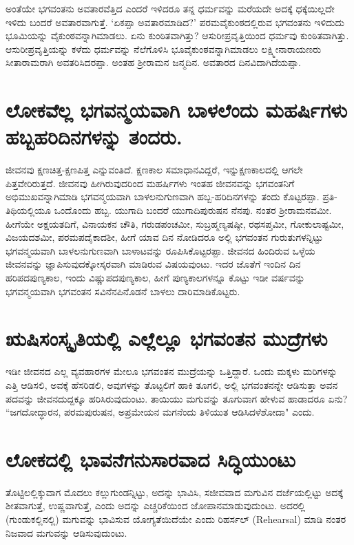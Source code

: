 ಅಂತೆಯೇ ಭಗವಂತನು ಅವತಾರವೆತ್ತಿದ ಎಂದರೆ ಇಳಿದರೂ ತನ್ನ ಧರ್ಮವನ್ನು ಮರೆಯದೇ ಅದಕ್ಕೆ ಧಕ್ಕೆಯಿಲ್ಲದೇ ಇಳಿದು ಬಂದರೆ ಅವತಾರವಾಗುತ್ತೆ. `ಏಕಪ್ಪಾ ಅವತಾರಮಾಡಿದ?' ಪರಮವೈಕುಂಠದಲ್ಲಿರುವ ಭಗವಂತನು ಇಳಿದುದು ಭೂಮಿಯನ್ನು ವೈಕುಂಠವನ್ನಾಗಿಮಾಡಲು. ಏನು ಕುಂಠಿತವಾಗಿತ್ತು? ಆಸುರೀಪ್ರವೃತ್ತಿಯಿಂದ ಧರ್ಮವು ಕುಂಠಿತವಾಗಿತ್ತು. ಆಸುರೀಪ್ರವೃತ್ತಿಯನ್ನು ಕಳೆದು ಧರ್ಮವನ್ನು ನೆಲೆಗೊಳಿಸಿ ಭೂವೈಕುಂಠವನ್ನಾಗಿಮಾಡಲು ಲಕ್ಷ್ಮೀನಾರಾಯಣರು ಸೀತಾರಾಮರಾಗಿ ಅವತರಿಸಿದರಪ್ಪಾ. ಅಂತಹ ಶ್ರೀರಾಮನ ಜನ್ಮದಿನ. ಅವತಾರದ ದಿನವಿದಾಗಿದೆಯಪ್ಪಾ. 

\section*{ಲೋಕವೆಲ್ಲ ಭಗವನ್ಮಯವಾಗಿ ಬಾಳಲೆಂದು ಮಹರ್ಷಿಗಳು ಹಬ್ಬಹರಿದಿನಗಳನ್ನು ತಂದರು.} 

ಜೀವನವು ಕ್ಷಣಚಿತ್ತ-ಕ್ಷಣಪಿತ್ತ ಎನ್ನುವಂತಿದೆ. ಕ್ಷಣಕಾಲ ಸಮಾಧಾನವಿದ್ದರೆ, ಇನ್ನುಕ್ಷಣಕಾಲದಲ್ಲಿ ಆಗಲೇ ಪಿತ್ತವೇರಿರುತ್ತದೆ. ಜೀವನವು ಹೀಗಿರುವುದರಿಂದ ಮಹರ್ಷಿಗಳು ಇಂತಹ ಜೀವನವನ್ನು ಭಗವಂತನಿಗೆ ಅಭಿಮುಖವನ್ನಾಗಿಮಾಡಿ ಭಗವನ್ಮಯವಾಗಿ ಬಾಳಲನುಗುಣವಾಗಿ ಹಬ್ಬ-ಹರಿದಿನಗಳನ್ನು ತಂದು ಕೊಟ್ಟರಪ್ಪಾ. ಪ್ರತಿ-ತಿಥಿಯಲ್ಲಿಯೂ ಒಂದೊಂದು ಹಬ್ಬ. ಯುಗಾದಿ ಬಂದರೆ ಯುಗಾದಿಪುರುಷನ ನೆನಪು. ನಂತರ ಶ್ರೀರಾಮನವಮೀ. ಹೀಗೆಯೇ ಅಕ್ಷಯತದಿಗೆ, ವಿನಾಯಕನ ಚೌತಿ, ಗರುಡಪಂಚಮೀ, ಸುಬ್ರಹ್ಮಣ್ಯಷಷ್ಠೀ, ರಥಸಪ್ತಮೀ, ಗೋಕುಲಾಷ್ಟಮೀ, ವಿಜಯದಶಮೀ, ಪರಮಪದೈಕಾದಶೀ, ಹೀಗೆ ಯಾವ ದಿನ ನೋಡಿದರೂ ಅಲ್ಲಿ ಭಗವಂತನ ಗುರುತುಗಳನ್ನಿಟ್ಟು ಭಗವನ್ಮಯವಾಗಿ ಬಾಳಲನುಗುಣವಾಗಿ ಬಾಳಾಟವನ್ನು ರೂಪಿಸಿಕೊಟ್ಟರಪ್ಪಾ. ಜೀವನದ ಹಿಂದಿರುವ ಒಳ್ಳೆಯ ಜೀವನವನ್ನು ಜ್ಞಾಪಿಸುವುದಕ್ಕೋಸ್ಕರವಾಗಿ ಮಾಡಿರುವ ವಿಷಯವುಂಟು. ಇದರ ಜೊತೆಗೆ ಇಂದಿನ ದಿನ ಹರಿಪದಪುಣ್ಯಕಾಲ, ಇಂದು ವಿಷ್ಣುಪದಪುಣ್ಯಕಾಲ, ಹೀಗೆ ಪುಣ್ಯಕಾಲಗಳನ್ನೂ ಕೊಟ್ಟು ಇಡೀ ವರ್ಷವನ್ನು ಭಗವನ್ಮಯವಾಗಿ ಭಗವಂತನ ಸವಿನೆನಪಿನೊಡನೆ ಬಾಳಲು ದಾರಿಮಾಡಿಕೊಟ್ಟರು. 

\section*{ಋಷಿಸಂಸ್ಕೃತಿಯಲ್ಲಿ ಎಲ್ಲೆಲ್ಲೂ ಭಗವಂತನ ಮುದ್ರೆಗಳು}

ಇಡೀ ಜೀವನದ ಎಲ್ಲ ವ್ಯವಹಾರಗಳ ಮೇಲೂ ಭಗವಂತನ ಮುದ್ರೆಯನ್ನು ಒತ್ತಿದ್ದಾರೆ. ಒಂದು ಮಕ್ಕಳು ಮರಿಗಳನ್ನು ಎತ್ತಿ ಆಡಿಸಲಿ, ಅವಕ್ಕೆ ಹೆಸರಿಡಲಿ, ಅವುಗಳನ್ನು ತೊಟ್ಟಲಿಗೆ ಹಾಕಿ ತೂಗಲಿ, ಅಲ್ಲಿ ಭಗವಂತನನ್ನೇ ಆಡಿಸುತ್ತಾ ಅವನ ಪದವನ್ನು ಜೀವನದುದ್ದಕ್ಕೂ ಹರಿಸಿರುವುದುಂಟು. ತಾಯಿಯು ಮಗುವನ್ನು ತೂಗುವಾಗ ಹೇಳುವ ಹಾಡಾದರೂ ಏನು? ``ಜಗದೋದ್ಧಾರನ, ಪರಮಪುರುಷನ, ಅಪ್ರಮೇಯನ ಮಗನೆಂದು ತಿಳಿಯುತ ಆಡಿಸಿದಳೆಶೋದಾ" ಎಂದು. 

\section*{ಲೋಕದಲ್ಲಿ ಭಾವನೆಗನುಸಾರವಾದ ಸಿದ್ಧಿಯುಂಟು}

ತೊಟ್ಟಿಲಲ್ಲಿಕ್ಕುವಾಗ ಮೊದಲು ಕಲ್ಲುಗುಂಡನ್ನಿಟ್ಟು, ಅದನ್ನು ಭಾವಿಸಿ, ಸಜೀವವಾದ ಮಗುವಿನ ದರ್ಜೆಯಲ್ಲಿಟ್ಟು ಅದಕ್ಕೆ ಶೀತವಾಗುತ್ತೆ, ಉಷ್ಣವಾಗುತ್ತೆ, ಎಂದು ಅದನ್ನು ಎಚ್ಚರಿಕೆಯಿಂದ ಜೋಪಾನಮಾಡುವುದುಂಟು. ಅದರಲ್ಲಿ (ಗುಂಡುಕಲ್ಲಿನಲ್ಲಿ) ಮಗುವನ್ನು ಭಾವಿಸುವ ಯೋಗ್ಯತೆಯಿದೆಯೇ ಎಂದು ರಿಹರ್ಸಲ್‍ ({\eng Rehearsal}) ಮಾಡಿ ನಂತರ ನಿಜವಾದ ಮಗುವನ್ನು ಆಡಿಸುವುದುಂಟು. 

